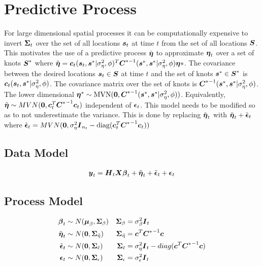 \documentclass[fleqn]{article}
\def\bm#1{\mbox{\boldmath $#1$}}
\begin{document}
\section{Predictive Process}
%
For large dimensional spatial processes it can be computationally expensive to invert $\bm{\Sigma}_t$ over the set of all locations $\bm{s}_t$ at time $t$ from the set of all locations $\bm{S}$. This motivates the use of a predictive process $\tilde{\bm{\eta}}$ to approximate $\bm{\eta}_t$ over a set of knots $\bm{S}^*$ where $\tilde{\bm{\eta}} = \bm{c}_t(\bm{s}_t, \bm{s}^* | \sigma^2_\eta, \phi)^T \bm{C}^{* - 1}(\bm{s}^*, \bm{s}^*  | \sigma^2_\eta, \phi) \bm{\eta}*$. The covariance between the desired locations $\bm{s}_t \in \bm{S}$ at time $t$ and the set of knots $\bm{s}^* \in \bm{S}^*$ is $\bm{c}_t(\bm{s}_t, \bm{s}^* | \sigma^2_\eta, \phi)$. The covariance matrix over the set of knots is $\bm{C}^{* - 1}(\bm{s}^*, \bm{s}^*  | \sigma^2_\eta, \phi)$. The lower dimensional $\bm{\eta}^* \sim \mbox{MVN}(\bm{0}, \bm{C}^{* - 1}(\bm{s}^*, \bm{s}^*  | \sigma^2_\eta, \phi) )$. Equivalently, $\tilde{\bm{\eta}} \sim MVN(\bm{0}, \bm{c}_t^T {\bm{C}^*}^{ - 1} \bm{c}_t)$ independent of $\bm{\epsilon}_t$. This model needs to be modified so as to not underestimate the variance. This is done by replacing $\tilde{\bm{\eta}}_t$ with $\tilde{\bm{\eta}}_t + \tilde{\bm{\epsilon}}_t$ where $\tilde{\bm{\epsilon}}_t = MVN(\bm{0}, \sigma^2_\eta \bm{I}_{n_t} - \mbox{diag} ( \bm{c}_t^T {\bm{C}^*}^{ - 1} \bm{c}_t))$
%
\subsection{Data Model}
\begin{align*}
\bm{y}_t & = \bm{H}_t \bm{X} \bm{\beta}_t + \tilde{\bm{\eta}}_t + \tilde{\bm{\epsilon}}_t + \bm{\epsilon}_t\\
%
\end{align*}
%
\subsection{Process Model}
%
\begin{align*}
%
\bm{\beta}_t & \sim N(\bm{\mu}_\beta, \bm{\Sigma}_\beta) & \bm{\Sigma}_\beta &  = \sigma^2_\beta \bm{I}_t\\
%
\tilde{\bm{\eta}}_t & \sim N(\bm{0}, \bm{\Sigma}_{\tilde{\eta}}) & \bm{\Sigma}_{\tilde{\eta}} &  = \bm{c}^T {\bm{C}^*}^{ - 1} \bm{c}\\
%
\tilde{\bm{\epsilon}}_t & \sim N(\bm{0}, \bm{\Sigma}_{\tilde{\epsilon}}) & \bm{\Sigma}_{\tilde{\epsilon}} &  = \sigma^2_\eta \bm{I}_t - diag(\bm{c}^T {\bm{C}^*}^{ - 1} \bm{c})\\
%
\bm{\epsilon}_t & \sim N(\bm{0}, \bm{\Sigma}_\epsilon) & \bm{\Sigma}_\epsilon & = \sigma^2_\epsilon \bm{I}_t
\end{align*}
%
\end{document}
